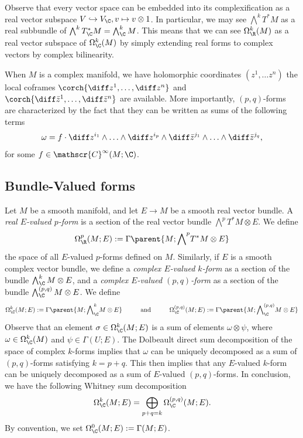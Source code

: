 Observe that every vector space can be embedded into its complexification as a real vector subspace \(V \hookrightarrow V_\C, v \mapsto v \otimes 1\). In particular, we may see \(\bigwedge^k T^*M\) as a real subbundle of \(\bigwedge^k T_\C^* M =\bigwedge^k_\C M\). This means that we can see \(\Omega_\R^k(M)\) as a real vector subspace of \(\Omega_\C^k(M)\) by simply extending real forms to complex vectors by complex bilinearity.
\begin{obs} \label{charac_pq_forms}
    When \(M\) is a complex manifold, we have holomorphic coordinates \((z^1, \ldots z^n)\) the local coframes \(\corch{\diff z^1, \ldots, \diff z^n}\) and \(\corch{\diff \bar{z}^1, \ldots, \diff \bar{z}^n}\) are available. More importantly, \((p,q)\)-forms are characterized by the fact that they can be written as sums of the following terms
    \begin{equation} \label{coordinates_complex_diff_form}
    \omega =  f \cdot \diff z^{i_1} \wedge \ldots \wedge \diff z^{i_p} \wedge \diff \bar{z}^{j_1} \wedge \ldots \wedge \diff \bar{z}^{j_q}, 
    \end{equation}
    for some \(f \in \mathscr{C}^\infty(M;\C)\).
\end{obs}

\subsection{Bundle-Valued forms} \label{section_bundle_valued_p_forms}
Let \(M\) be a smooth manifold, and let \(E\to M\) be a smooth real vector bundle. A \textit{real \(E\)-valued \(p\)-form} is a section of the real vector bundle \(\bigwedge^p T^*M \otimes E\). We define 
\[
\Omega^p_\R(M;E):=\Gamma\parent{M;{\bigwedge}^pT^*M\otimes E}
\] 
the space of all \(E\)-valued \(p\)-forms defined on \(M\). Similarly, if \(E\) is a smooth complex vector bundle, we define a \textit{complex \(E\)-valued \(k\)-form} as a section of the bundle \(\bigwedge^k_\C M \otimes E\), and a \textit{complex \(E\)-valued \((p,q)\)-form} as a section of the bundle \(\bigwedge_\C^{(p,q)}M \otimes E\). We define 
\[
\Omega^k_\C(M;E):=\Gamma \parent{M; {\bigwedge}^k_\C M \otimes E} \hspace{1 cm} \text{and} \hspace{1 cm}
\Omega^{(p,q)}_\C(M;E):=\Gamma \parent{M;{\bigwedge}^{(p,q)}_\C M \otimes E}
\]
Observe that an element \(\sigma \in \Omega_\C^{k}(M;E)\) is a sum of elements \(\omega \otimes \psi\), where \(\omega \in \Omega_\C^{k}(M)\) and \(\psi \in \Gamma(U;E)\). The Dolbeault direct sum decomposition of the space of complex \(k\)-forms implies that \(\omega\) can be uniquely decomposed as a sum of \((p,q)\)-forms satisfying \(k=p+q\). This then implies that any \(E\)-valued \(k\)-form can be uniquely decomposed as a sum of \(E\)-valued \((p,q)\)-forms. In conclusion, we have the following Whitney sum decomposition
\begin{equation} \label{eq_decomp_E_forms}
\Omega^k_\C(M; E)=\bigoplus_{p+q=k} \Omega_\C^{(p,q)}(M;E).
\end{equation}
By convention, we set \(\Omega_\C^0(M;E):=\Gamma(M;E)\).

